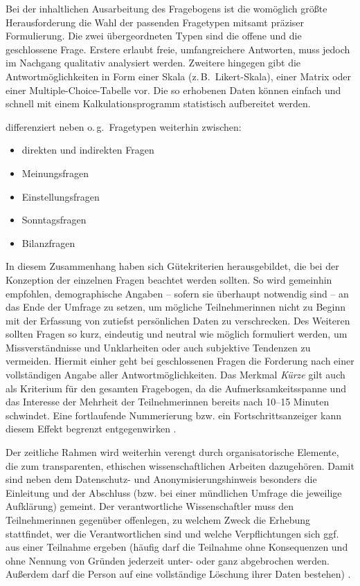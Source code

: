 Bei der inhaltlichen Ausarbeitung des Fragebogens ist die womöglich größte Herausforderung die Wahl der passenden Fragetypen mitsamt präziser Formulierung. Die zwei übergeordneten Typen sind die offene und die geschlossene Frage. Erstere erlaubt freie, umfangreichere Antworten, muss jedoch im Nachgang qualitativ analysiert werden. Zweitere hingegen gibt die Antwortmöglichkeiten in Form einer Skala (z.\,B.\ Likert-Skala), einer Matrix oder einer Multiple-Choice-Tabelle vor. Die so erhobenen Daten können einfach und schnell mit einem Kalkulationsprogramm statistisch aufbereitet werden.

\citet[139\psqq]{atteslander_methoden_2010} differenziert neben o.\,g.\ Fragetypen weiterhin zwischen:
\begin{itemize}
    \item direkten und indirekten Fragen
    \item Meinungsfragen
    \item Einstellungsfragen
    \item Sonntagsfragen
    \item Bilanzfragen
\end{itemize}

In diesem Zusammenhang haben sich Gütekriterien herausgebildet, die bei der Konzeption der einzelnen Fragen beachtet werden sollten. So wird gemeinhin empfohlen, demographische Angaben -- sofern sie überhaupt notwendig sind -- an das Ende der Umfrage zu setzen, um mögliche Teilnehmer{\textperiodcentered}innen nicht zu Beginn mit der Erfassung von zutiefst persönlichen Daten zu verschrecken. Des Weiteren sollten Fragen so kurz, eindeutig und neutral wie möglich formuliert werden, um Missverständnisse und Unklarheiten oder auch subjektive Tendenzen zu vermeiden. Hiermit einher geht bei geschlossenen Fragen die Forderung nach einer vollständigen Angabe aller Antwortmöglichkeiten. Das Merkmal \emph{Kürze} gilt auch als Kriterium für den gesamten Fragebogen, da die Aufmerksamkeitsspanne und das Interesse der Mehrheit der Teilnehmer{\textperiodcentered}innen bereits nach 10--15 Minuten schwindet. Eine fortlaufende Nummerierung bzw. ein Fortschrittsanzeiger kann diesem Effekt begrenzt entgegenwirken \citep[170]{aeppli_empirisches_2016}.

Der zeitliche Rahmen wird weiterhin verengt durch organisatorische Elemente, die zum transparenten, ethischen wissenschaftlichen Arbeiten dazugehören. Damit sind neben dem Datenschutz- und Anonymisierungshinweis besonders die Einleitung und der Abschluss (bzw. bei einer mündlichen Umfrage die jeweilige Aufklärung) gemeint. Der verantwortliche Wissenschaftler muss den Teilnehmer{\textperiodcentered}innen gegenüber offenlegen, zu welchem Zweck die Erhebung stattfindet, wer die Verantwortlichen sind und welche Verpflichtungen sich ggf. aus einer Teilnahme ergeben (häufig darf die Teilnahme ohne Konsequenzen und ohne Nennung von Gründen jederzeit unter- oder ganz abgebrochen werden. Außerdem darf die Person auf eine vollständige Löschung ihrer Daten bestehen) \citep[147]{atteslander_methoden_2010}. 


